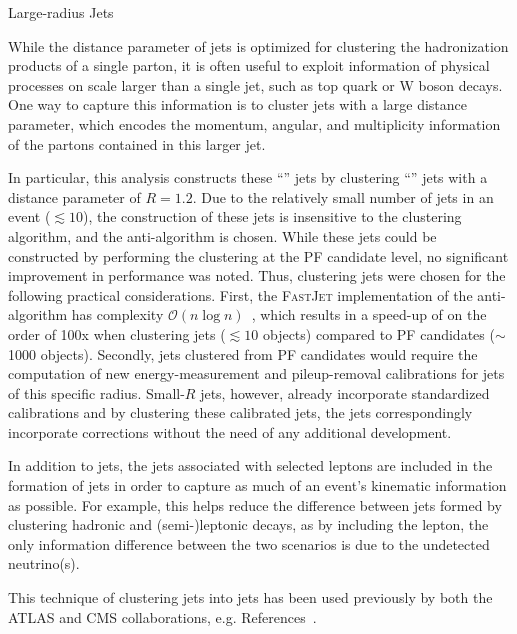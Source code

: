 \begin{section}{Large-radius Jets}

While the distance parameter of \smallR jets is optimized for clustering the hadronization products of a single parton, it is often useful to exploit information of physical processes on scale larger than a single jet, such as top quark or W boson decays.
One way to capture this information is to cluster jets with a large distance parameter, which encodes the momentum, angular, and multiplicity information of the partons contained in this larger jet.

In particular, this analysis constructs these ``\largeR'' jets by clustering ``\smallR'' jets with a distance parameter of $R = 1.2$.
Due to the relatively small number of \smallR jets in an event ($\lesssim 10$), the construction of these \largeR jets is insensitive to the clustering algorithm, and the anti-\kT algorithm is chosen.
While these \largeR jets could be constructed by performing the clustering at the PF candidate level, no significant improvement in performance was noted.
Thus, clustering \smallR jets were chosen for the following practical considerations.
First, the \textsc{FastJet} implementation of the anti-\kT algorithm has complexity $\mathcal{O}(n\log n)$~\cite{Cacciari:2005hq}, which results in a speed-up of on the order of 100x when clustering \smallR jets ($\lesssim 10$ objects) compared to PF candidates ($\sim$1000 objects).
Secondly, \largeR jets clustered from PF candidates would require the computation of new energy-measurement and pileup-removal calibrations for jets of this specific radius.
Small-$R$ jets, however, already incorporate standardized calibrations and by clustering these calibrated \smallR jets, the \largeR jets correspondingly incorporate corrections without the need of any additional development.

In addition to \smallR jets, the jets associated with selected leptons are included in the formation of \largeR jets in order to capture as much of an event's kinematic information as possible.
For example, this helps reduce the difference between \largeR jets formed by clustering hadronic and (semi-)leptonic decays, as by including the lepton, the only information difference between the two scenarios is due to the undetected neutrino(s).

This technique of clustering \smallR jets into \largeR jets has been used previously by both the ATLAS and CMS collaborations, e.g. References~\cite{Aaboud:2017aeu,Khachatryan:2016uwr}.


\end{section}
